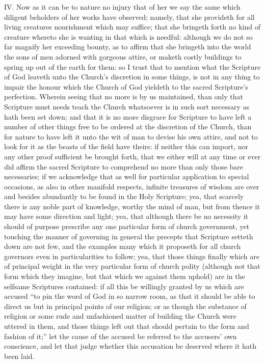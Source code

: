 IV. Now as it can be to nature no injury that of her we say the same which diligent beholders of her works have observed; namely, that she provideth for all living creatures nourishment which may suffice; that she bringeth forth no kind of creature whereto she is wanting in that which is needful: although we do not so far magnify her exceeding bounty, as to affirm that she bringeth into the world the sons of men  adorned with gorgeous attire, or maketh costly buildings to spring up out of the earth for them: so I trust that to mention what the Scripture of God leaveth unto the Church’s discretion in some things, is not in any thing to impair the honour which the Church of God yieldeth to the sacred Scripture’s perfection. Wherein seeing that no more is by us maintained, than only that Scripture must needs teach the Church whatsoever is in such sort necessary as hath been set down; and that it is no more disgrace for Scripture to have left a number of other things free to be ordered at the discretion of the Church, than for nature to have left it unto the wit of man to devise his own attire, and not to look for it as the beasts of the field have theirs: if neither this can import, nor any other proof sufficient be brought forth, that we either will at any time or ever did affirm the sacred Scripture to comprehend no more than only those bare necessaries; if we acknowledge that as well for particular application to special occasions, as also in other manifold respects, infinite treasures of wisdom are over and besides abundantly to be found in the Holy Scripture; yea, that scarcely there is any noble part of knowledge, worthy the mind of man, but from thence it may have some direction and light; yea, that although there be no necessity it should of purpose prescribe any one particular form of church government, yet touching the manner of governing in general the precepts that Scripture setteth down are not few, and the examples many which it proposeth for all church governors even in particularities to follow; yea, that those things finally which are of principal weight in the very particular form of church polity (although not that form which they imagine, but that which we against them uphold) are in the selfsame Scriptures contained: if all this be willingly granted by us which are accused “to pin the word of God in so narrow room, as that it should be able to direct us but in principal points of our religion; or as though the substance of religion or some rude and unfashioned matter of building the Church were uttered in them, and those things left out that should pertain to the form and fashion of it;” let the cause of the accused be referred to the accusers’ own conscience, and let that judge whether this accusation be deserved where it hath been laid.

